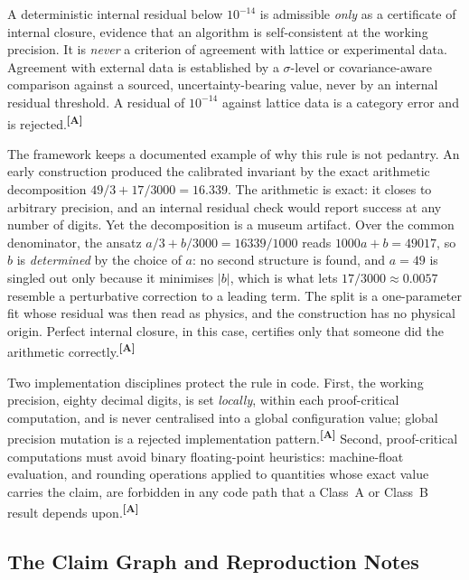 \documentclass[12pt,a4paper,twoside]{article}
\theoremstyle{plain}
\theoremstyle{definition}
\theoremstyle{remark}
\newcommand{\catmark}[1]{\textsuperscript{\textsf{\textbf{[#1]}}}}
\begin{document}
\begin{governancebox}
A deterministic internal residual below $10^{-14}$ is admissible
\emph{only} as a certificate of internal closure, evidence that an
algorithm is self-consistent at the working precision. It is
\emph{never} a criterion of agreement with lattice or experimental data.
Agreement with external data is established by a $\sigma$-level or
covariance-aware comparison against a sourced, uncertainty-bearing
value, never by an internal residual threshold. A residual of $10^{-14}$
against lattice data is a category error and is rejected.\catmark{A}
\end{governancebox}

\noindent The framework keeps a documented example of why this rule is
not pedantry. An early construction produced the calibrated invariant by
the exact arithmetic decomposition $49/3 + 17/3000 = 16.339$. The
arithmetic is exact: it closes to arbitrary precision, and an internal
residual check would report success at any number of digits. Yet the
decomposition is a museum artifact. Over the common denominator, the
ansatz $a/3 + b/3000 = 16339/1000$ reads $1000a + b = 49017$, so $b$ is
\emph{determined} by the choice of $a$: no second structure is found,
and $a = 49$ is singled out only because it minimises $|b|$, which is
what lets $17/3000 \approx 0.0057$ resemble a perturbative correction
to a leading term. The split is a one-parameter fit whose residual was
then read as physics, and the construction has no physical origin.
Perfect internal closure, in this case, certifies only that someone
did the arithmetic correctly.\catmark{A}

Two implementation disciplines protect the rule in code. First, the
working precision, eighty decimal digits, is set \emph{locally}, within
each proof-critical computation, and is never centralised into a global
configuration value; global precision mutation is a rejected
implementation pattern.\catmark{A} Second, proof-critical computations
must avoid binary floating-point heuristics: machine-float evaluation,
and rounding operations applied to quantities whose exact value carries
the claim, are forbidden in any code path that a Class~A or Class~B
result depends upon.\catmark{A}

\subsection{The Claim Graph and Reproduction Notes}
\label{subsec:claim-graph}
\end{document}
